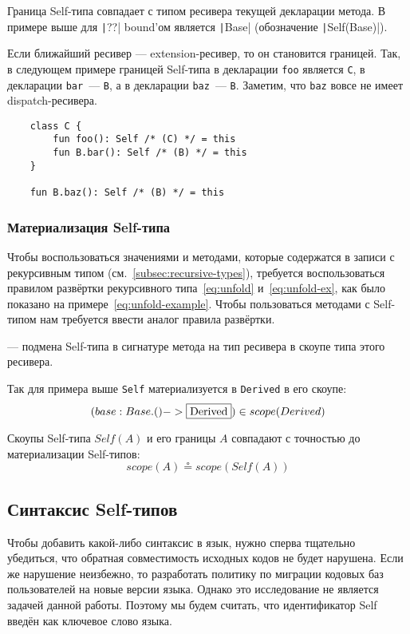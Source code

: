 Граница Self-типа совпадает с типом ресивера текущей декларации метода.
В примере выше для \texttt|??| bound'ом является \texttt|Base| (обозначение \texttt|Self(Base)|).

Если ближайший ресивер --- extension-ресивер, то он становится границей.
Так, в следующем примере границей Self-типа в декларации \texttt{foo} является \texttt{C}, в декларации \texttt{bar}~--- \texttt{B}, а в декларации \texttt{baz}~--- \texttt{B}.
Заметим, что \texttt{baz} вовсе не имеет dispatch-ресивера.

\begin{verbatim}
    class C {
        fun foo(): Self /* (C) */ = this
        fun B.bar(): Self /* (B) */ = this
    }

    fun B.baz(): Self /* (B) */ = this
\end{verbatim}

\subsubsection{Материализация Self-типа}

Чтобы воспользоваться значениями и методами, которые содержатся в записи с рекурсивным типом (см.~\ref{subsec:recursive-types}), требуется воспользоваться правилом развёртки рекурсивного типа~\eqref{eq:unfold} и~\eqref{eq:unfold-ex}, как было показано на примере~\eqref{eq:unfold-example}.
Чтобы пользоваться методами с Self-типом нам требуется ввести аналог правила развёртки.

\begin{definition}
    \label{def:materialization}
     --- подмена Self-типа в сигнатуре метода на тип ресивера в скоупе типа этого ресивера.
\end{definition}

Так для примера выше \texttt{Self} материализуется в \texttt{Derived} в его скоупе:
\[(base: Base.() -> \framebox{Derived}) \in scope(Derived)\]

Скоупы Self-типа $Self(A)$ и его границы $A$ совпадают с точностью до материализации Self-типов:
\[scope(A) \circeq scope(Self(A))\]


\subsection{Синтаксис Self-типов}

Чтобы добавить какой-либо синтаксис в язык, нужно сперва тщательно убедиться, что обратная совместимость исходных кодов не будет нарушена.
Если же нарушение неизбежно, то разработать политику по миграции кодовых баз пользователей на новые версии языка.
Однако это исследование не является задачей данной работы.
Поэтому мы будем считать, что идентификатор Self введён как ключевое слово языка.

